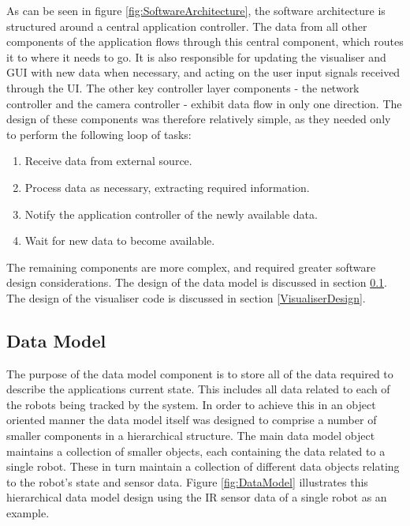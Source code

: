 As can be seen in figure \ref{fig:SoftwareArchitecture}, the software architecture is structured around a central application controller. The data from all other components of the application flows through this central component, which routes it to where it needs to go. It is also responsible for updating the visualiser and GUI with new data when necessary, and acting on the user input signals received through the UI. The other key controller layer components - the network controller and the camera controller - exhibit data flow in only one direction. The design of these components was therefore relatively simple, as they needed only to perform the following loop of tasks:

\begin{enumerate}
 \item Receive data from external source.
 \item Process data as necessary, extracting required information.
 \item Notify the application controller of the newly available data.
 \item Wait for new data to become available.
\end{enumerate}

The remaining components are more complex, and required greater software design considerations. The design of the data model is discussed in section \ref{DataModelDesign}. The design of the visualiser code is discussed in section \ref{VisualiserDesign}.

\subsection{Data Model} \label{DataModelDesign}
The purpose of the data model component is to store all of the data required to describe the applications current state. This includes all data related to each of the robots being tracked by the system. In order to achieve this in an object oriented manner the data model itself was designed to comprise a number of smaller components in a hierarchical structure. The main data model object maintains a collection of smaller objects, each containing the data related to a single robot. These in turn maintain a collection of different data objects relating to the robot's state and sensor data. Figure \ref{fig:DataModel} illustrates this hierarchical data model design using the IR sensor data of a single robot as an example.

